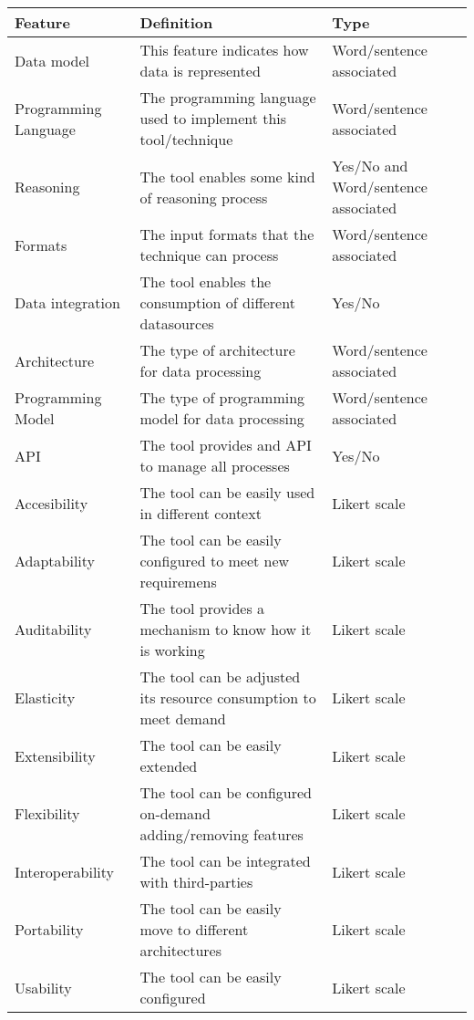 \begin{table}[!ht]
\renewcommand{\arraystretch}{1.3}
\tiny
\begin{center}
\begin{tabular}[c]{|p{2.5cm}|p{5cm}|p{3cm}|} 
\hline
  \textbf{Feature} &  \textbf{Definition}  &  \textbf{Type} \\\hline
  Data model & This feature indicates how data is represented & Word/sentence associated \\ \hline
  Programming Language & The programming language used to implement this tool/technique & Word/sentence associated \\ \hline
  Reasoning & The tool enables some kind of reasoning process & Yes/No and Word/sentence associated  \\ \hline
  Formats & The input formats that the technique can process & Word/sentence associated  \\ \hline
  Data integration & The tool enables the consumption of different datasources &  Yes/No \\ \hline
  Architecture & The type of architecture for data processing & Word/sentence associated\\ \hline
  Programming Model & The type of programming model for data processing  & Word/sentence associated\\ \hline
  API & The tool provides and API to manage all processes & Yes/No  \\ \hline
  Accesibility & The tool can be easily used in different context & Likert scale  \\ \hline
  Adaptability & The tool can be easily configured to meet new requiremens & Likert scale  \\ \hline
  Auditability & The tool provides a mechanism to know how it is working & Likert scale  \\ \hline
  Elasticity & The tool can be adjusted its resource consumption to meet demand & Likert scale  \\ \hline
  Extensibility & The tool can be easily extended & Likert scale  \\ \hline
  Flexibility & The tool can be configured on-demand adding/removing features & Likert scale  \\ \hline  
  Interoperability & The tool can be integrated with third-parties  & Likert scale  \\ \hline
  Portability & The tool can be easily move to different architectures & Likert scale  \\ \hline
  Usability & The tool can be easily configured  & Likert scale  \\ \hline

\end{tabular}
\end{center}
\end{table}
